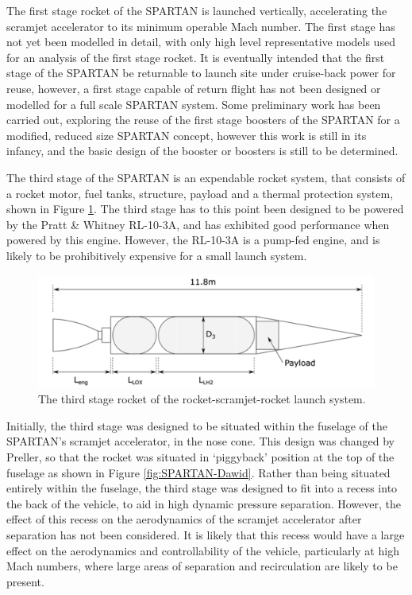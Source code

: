  

The first stage rocket of the SPARTAN is launched vertically, accelerating the scramjet accelerator to its minimum operable Mach number. The first stage has not yet been modelled in detail, with only high level representative models used for an analysis of the first stage rocket\cite{Preller2018a}.
It is eventually intended that the first stage of the SPARTAN be returnable to launch site under cruise-back power for reuse, however, a first stage capable of return flight has not been designed or modelled for a full scale SPARTAN system\cite{Preller2017b,Preller2018a}.
 Some preliminary work has been carried out, exploring the reuse of the first stage boosters of the SPARTAN \cite{chai2017} for a modified, reduced size SPARTAN concept, however this work is still in its infancy, and the basic design of the booster or boosters is still to be determined\cite{Preller2017b,Preller2018a}.
 
  

The third stage of the SPARTAN is an expendable rocket system, that consists of a rocket motor, fuel tanks, structure, payload and a thermal protection system\cite{Preller2017b}, shown in Figure \ref{fig:ThirdStage}. The third stage has to this point been designed to be powered by the Pratt \& Whitney RL-10-3A\cite{Preller2017b}, and has exhibited good performance when powered by this engine. However, the RL-10-3A is a pump-fed engine, and is likely to be prohibitively expensive for a small launch system.
\begin{figure}[ht]
	\centering
	\includegraphics[width=0.7\linewidth]{figures/2_literature-review/ThirdStage}
	\caption{The third stage rocket of the rocket-scramjet-rocket launch system\cite{Preller2017b}.}
	\label{fig:ThirdStage}
\end{figure}
 Initially, the third stage was designed to be situated within the fuselage of the SPARTAN's scramjet accelerator, in the nose cone\cite{Jazra2013}. This design was changed by Preller\cite{Preller2018a,Preller2017b}, so that the rocket was situated in `piggyback' position at the top of the fuselage as shown in Figure \ref{fig:SPARTAN-Dawid}. Rather than being situated entirely within the fuselage, the third stage was designed to fit into a recess into the back of the vehicle, to aid in high dynamic pressure separation. However, the effect of this recess on the aerodynamics of the scramjet accelerator after separation has not been considered\cite{Preller2018a,Preller2017b}. It is likely that this recess would have a large effect on the aerodynamics and controllability of the vehicle, particularly at high Mach numbers, where large areas of separation and recirculation are likely to be present. 





